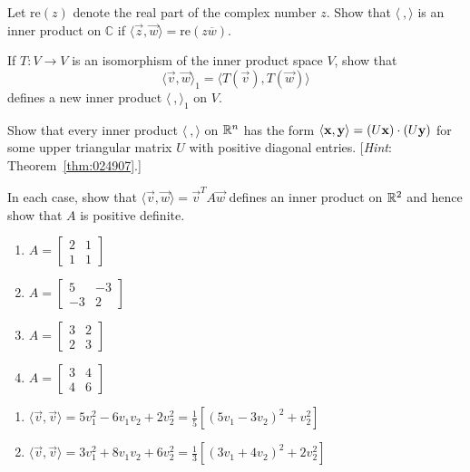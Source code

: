 \documentclass{ximera}
\begin{document}
\begin{problem}\label{prob:inner_prod_9}
Let $\mbox{re}(z)$ denote the real part of the complex number
$z$. Show that $\langle\ , \rangle$ is an inner product on $\mathbb{C}$ if $\langle\vec{z}, \vec{w}\rangle = \mbox{re}(z\overline{w})$.
\end{problem}

\begin{problem}\label{prob:inner_prod_10}
If $T : V \to V$ is an isomorphism of the inner product space $V$, show that
\begin{equation*}
\langle \vec{v}, \vec{w} \rangle_1 = \langle T(\vec{v}), T(\vec{w}) \rangle
\end{equation*}
defines a new inner product $\langle\ , \rangle_{1}$ on $V$.
\end{problem}

\begin{problem}\label{prob:inner_prod_11}
Show that every inner product $\langle\ , \rangle$ on $\mathbb{R}^n$ has the form $\langle\mathbf{x}, \mathbf{y}\rangle = (U\mathbf{x}) \cdot (U\mathbf{y})$ for some upper triangular matrix $U$ with positive diagonal entries. [\textit{Hint}: Theorem~\ref{thm:024907}.]
\end{problem}

\begin{problem}\label{prob:inner_prod_12}
In each case, show that $\langle\vec{v}, \vec{w}\rangle = \vec{v}^{T}A\vec{w}$ defines an inner product on $\mathbb{R}^2$ and hence show that $A$ is positive definite.
\begin{enumerate}
\item
$A =
\left[ \begin{array}{rr}
2 & 1 \\
1 & 1
\end{array} \right]$
\item
$A =
\left[ \begin{array}{rr}
5 & -3 \\
-3 & 2
\end{array} \right]$
\item
$A =
\left[ \begin{array}{rr}
3 & 2 \\
2 & 3
\end{array} \right]$
\item
$A =
\left[ \begin{array}{rr}
3 & 4 \\
4 & 6
\end{array} \right]$
\end{enumerate}
\begin{hint}
\begin{enumerate} 
 
\item  $  \langle \vec{v}, \vec{v} \rangle = 5v_1^2 - 6v_1v_2 + 2v_2^2 =
\frac{1}{5}[(5v_1 - 3v_2)^2 + v_2^2] $


\item  $ \langle \vec{v}, \vec{v} \rangle = 3v_1^2 + 8v_1v_2 + 6v_2^2 =
\frac{1}{3}[(3v_1 + 4v_2)^2 + 2v_2^2] $

\end{enumerate}
\end{hint}
\end{problem}
\end{document}
